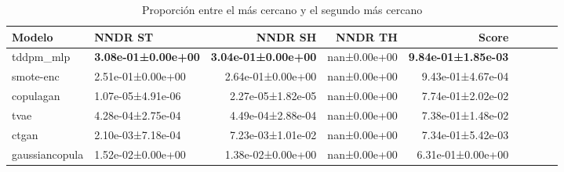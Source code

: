 \begin{table}[H]
\centering
\fontsize{10}{14}\selectfont
\caption{Proporción entre el más cercano y el segundo más cercano}
\label{table-dcr-economicos-b}
\begin{tabular}{|l|l|r|r|r|r|r|r|r|}
\hline
\rowcolor[gray]{0.8}
Modelo & NNDR ST & NNDR SH & NNDR TH & \textbf{Score} \\
\hline tddpm\_mlp & \bfseries 3.08e-01±0.00e+00 & \bfseries 3.04e-01±0.00e+00 & nan±0.00e+00 & \bfseries 9.84e-01±1.85e-03 \\
\hline smote-enc & 2.51e-01±0.00e+00 & 2.64e-01±0.00e+00 & nan±0.00e+00 & 9.43e-01±4.67e-04 \\
\hline copulagan & \cellcolor[rgb]{0.9, 0.54, 0.52} 1.07e-05±4.91e-06 & 2.27e-05±1.82e-05 & nan±0.00e+00 & 7.74e-01±2.02e-02 \\
\hline tvae & 4.28e-04±2.75e-04 & 4.49e-04±2.88e-04 & nan±0.00e+00 & 7.38e-01±1.48e-02 \\
\hline ctgan & 2.10e-03±7.18e-04 & \cellcolor[rgb]{0.9, 0.54, 0.52} 7.23e-03±1.01e-02 & nan±0.00e+00 & 7.34e-01±5.42e-03 \\
\hline gaussiancopula & 1.52e-02±0.00e+00 & 1.38e-02±0.00e+00 & nan±0.00e+00 & \cellcolor[rgb]{0.9, 0.54, 0.52} 6.31e-01±0.00e+00 \\
\hline
\end{tabular}
\end{table}
